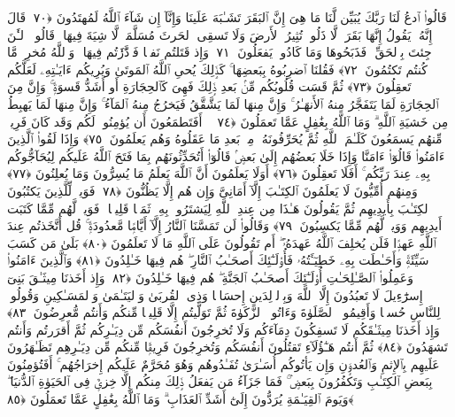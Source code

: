  قَالُوا۟ ٱدعُ لَنَا رَبَّكَ يُبَيِّن لَّنَا مَا هِىَ إِنَّ ٱلبَقَرَ تَشَـٰبَهَ عَلَينَا وَإِنَّآ إِن شَآءَ ٱللَّهُ لَمُهتَدُونَ ﴿٧٠﴾
 قَالَ إِنَّهُۥ يَقُولُ إِنَّهَا بَقَرَةٌۭ لَّا ذَلُولٌۭ تُثِيرُ ٱلأَرضَ وَلَا تَسقِى ٱلحَرثَ مُسَلَّمَةٌۭ لَّا شِيَةَ فِيهَا ۚ قَالُوا۟ ٱلـَٰٔنَ جِئتَ بِٱلحَقِّ ۚ فَذَبَحُوهَا وَمَا كَادُوا۟ يَفعَلُونَ ﴿٧١﴾
 وَإِذ قَتَلتُم نَفسًۭا فَٱدَّٰرَٰٔتُم فِيهَا ۖ وَٱللَّهُ مُخرِجٌۭ مَّا كُنتُم تَكتُمُونَ ﴿٧٢﴾
 فَقُلنَا ٱضرِبُوهُ بِبَعضِهَا ۚ كَذَٟلِكَ يُحىِ ٱللَّهُ ٱلمَوتَىٰ وَيُرِيكُم ءَايَـٰتِهِۦ لَعَلَّكُم تَعقِلُونَ ﴿٧٣﴾
 ثُمَّ قَسَت قُلُوبُكُم مِّنۢ بَعدِ ذَٟلِكَ فَهِىَ كَٱلحِجَارَةِ أَو أَشَدُّ قَسوَةًۭ ۚ وَإِنَّ مِنَ ٱلحِجَارَةِ لَمَا يَتَفَجَّرُ مِنهُ ٱلأَنهَـٰرُ ۚ وَإِنَّ مِنهَا لَمَا يَشَّقَّقُ فَيَخرُجُ مِنهُ ٱلمَآءُ ۚ وَإِنَّ مِنهَا لَمَا يَهبِطُ مِن خَشيَةِ ٱللَّهِ ۗ وَمَا ٱللَّهُ بِغَٰفِلٍ عَمَّا تَعمَلُونَ ﴿٧٤﴾
 ۞ أَفَتَطمَعُونَ أَن يُؤمِنُوا۟ لَكُم وَقَد كَانَ فَرِيقٌۭ مِّنهُم يَسمَعُونَ كَلَـٰمَ ٱللَّهِ ثُمَّ يُحَرِّفُونَهُۥ مِنۢ بَعدِ مَا عَقَلُوهُ وَهُم يَعلَمُونَ ﴿٧٥﴾
 وَإِذَا لَقُوا۟ ٱلَّذِينَ ءَامَنُوا۟ قَالُوٓا۟ ءَامَنَّا وَإِذَا خَلَا بَعضُهُم إِلَىٰ بَعضٍۢ قَالُوٓا۟ أَتُحَدِّثُونَهُم بِمَا فَتَحَ ٱللَّهُ عَلَيكُم لِيُحَآجُّوكُم بِهِۦ عِندَ رَبِّكُم ۚ أَفَلَا تَعقِلُونَ ﴿٧٦﴾
 أَوَلَا يَعلَمُونَ أَنَّ ٱللَّهَ يَعلَمُ مَا يُسِرُّونَ وَمَا يُعلِنُونَ ﴿٧٧﴾
 وَمِنهُم أُمِّيُّونَ لَا يَعلَمُونَ ٱلكِتَـٰبَ إِلَّآ أَمَانِىَّ وَإِن هُم إِلَّا يَظُنُّونَ ﴿٧٨﴾
 فَوَيلٌۭ لِّلَّذِينَ يَكتُبُونَ ٱلكِتَـٰبَ بِأَيدِيهِم ثُمَّ يَقُولُونَ هَـٰذَا مِن عِندِ ٱللَّهِ لِيَشتَرُوا۟ بِهِۦ ثَمَنًۭا قَلِيلًۭا ۖ فَوَيلٌۭ لَّهُم مِّمَّا كَتَبَت أَيدِيهِم وَوَيلٌۭ لَّهُم مِّمَّا يَكسِبُونَ ﴿٧٩﴾
 وَقَالُوا۟ لَن تَمَسَّنَا ٱلنَّارُ إِلَّآ أَيَّامًۭا مَّعدُودَةًۭ ۚ قُل أَتَّخَذتُم عِندَ ٱللَّهِ عَهدًۭا فَلَن يُخلِفَ ٱللَّهُ عَهدَهُۥٓ ۖ أَم تَقُولُونَ عَلَى ٱللَّهِ مَا لَا تَعلَمُونَ ﴿٨٠﴾
 بَلَىٰ مَن كَسَبَ سَيِّئَةًۭ وَأَحَـٰطَت بِهِۦ خَطِيٓـَٔتُهُۥ فَأُو۟لَـٰٓئِكَ أَصحَـٰبُ ٱلنَّارِ ۖ هُم فِيهَا خَـٰلِدُونَ ﴿٨١﴾
 وَٱلَّذِينَ ءَامَنُوا۟ وَعَمِلُوا۟ ٱلصَّـٰلِحَـٰتِ أُو۟لَـٰٓئِكَ أَصحَـٰبُ ٱلجَنَّةِ ۖ هُم فِيهَا خَـٰلِدُونَ ﴿٨٢﴾
 وَإِذ أَخَذنَا مِيثَـٰقَ بَنِىٓ إِسرَٰٓءِيلَ لَا تَعبُدُونَ إِلَّا ٱللَّهَ وَبِٱلوَٟلِدَينِ إِحسَانًۭا وَذِى ٱلقُربَىٰ وَٱليَتَـٰمَىٰ وَٱلمَسَـٰكِينِ وَقُولُوا۟ لِلنَّاسِ حُسنًۭا وَأَقِيمُوا۟ ٱلصَّلَوٰةَ وَءَاتُوا۟ ٱلزَّكَوٰةَ ثُمَّ تَوَلَّيتُم إِلَّا قَلِيلًۭا مِّنكُم وَأَنتُم مُّعرِضُونَ ﴿٨٣﴾
 وَإِذ أَخَذنَا مِيثَـٰقَكُم لَا تَسفِكُونَ دِمَآءَكُم وَلَا تُخرِجُونَ أَنفُسَكُم مِّن دِيَـٰرِكُم ثُمَّ أَقرَرتُم وَأَنتُم تَشهَدُونَ ﴿٨٤﴾
 ثُمَّ أَنتُم هَـٰٓؤُلَآءِ تَقتُلُونَ أَنفُسَكُم وَتُخرِجُونَ فَرِيقًۭا مِّنكُم مِّن دِيَـٰرِهِم تَظَـٰهَرُونَ عَلَيهِم بِٱلإِثمِ وَٱلعُدوَٟنِ وَإِن يَأتُوكُم أُسَـٰرَىٰ تُفَـٰدُوهُم وَهُوَ مُحَرَّمٌ عَلَيكُم إِخرَاجُهُم ۚ أَفَتُؤمِنُونَ بِبَعضِ ٱلكِتَـٰبِ وَتَكفُرُونَ بِبَعضٍۢ ۚ فَمَا جَزَآءُ مَن يَفعَلُ ذَٟلِكَ مِنكُم إِلَّا خِزىٌۭ فِى ٱلحَيَوٰةِ ٱلدُّنيَا ۖ وَيَومَ ٱلقِيَـٰمَةِ يُرَدُّونَ إِلَىٰٓ أَشَدِّ ٱلعَذَابِ ۗ وَمَا ٱللَّهُ بِغَٰفِلٍ عَمَّا تَعمَلُونَ ﴿٨٥﴾
